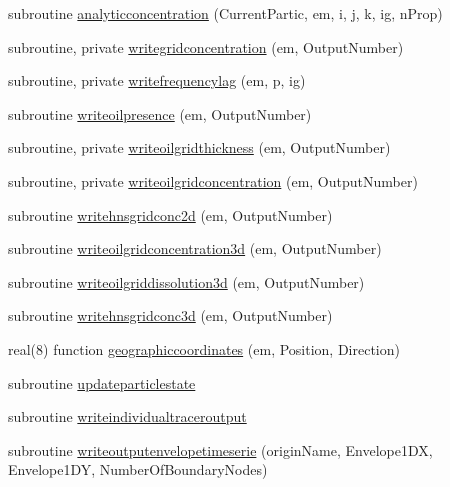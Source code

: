 \begin{DoxyCompactItemize}
\item 
subroutine \mbox{\hyperlink{namespacemodulelagrangianglobal_a8a4e3b4aa0ee023ec48a0d9e44b5df43}{analyticconcentration}} (Current\+Partic, em, i, j, k, ig, n\+Prop)
\item 
subroutine, private \mbox{\hyperlink{namespacemodulelagrangianglobal_a071a32ced5fdfb667319483a8fd208b7}{writegridconcentration}} (em, Output\+Number)
\item 
subroutine, private \mbox{\hyperlink{namespacemodulelagrangianglobal_a091fa515c0c76fbe52d2c31ad026151d}{writefrequencylag}} (em, p, ig)
\item 
subroutine \mbox{\hyperlink{namespacemodulelagrangianglobal_ab6a14231f1191c9852f886b90950db80}{writeoilpresence}} (em, Output\+Number)
\item 
subroutine, private \mbox{\hyperlink{namespacemodulelagrangianglobal_a388d34c449f0175617349ab4081a3dd4}{writeoilgridthickness}} (em, Output\+Number)
\item 
subroutine, private \mbox{\hyperlink{namespacemodulelagrangianglobal_a82208b2a591060e1fa3a3e0726bfe869}{writeoilgridconcentration}} (em, Output\+Number)
\item 
subroutine \mbox{\hyperlink{namespacemodulelagrangianglobal_abb393e682c261146ef53a65a75c60c4a}{writehnsgridconc2d}} (em, Output\+Number)
\item 
subroutine \mbox{\hyperlink{namespacemodulelagrangianglobal_ab2996daa63e4058df80e1dc7894c41af}{writeoilgridconcentration3d}} (em, Output\+Number)
\item 
subroutine \mbox{\hyperlink{namespacemodulelagrangianglobal_ac2eff795bcd9d725896afa0d50c89794}{writeoilgriddissolution3d}} (em, Output\+Number)
\item 
subroutine \mbox{\hyperlink{namespacemodulelagrangianglobal_a94325a61c883247ceef185733a82f5d2}{writehnsgridconc3d}} (em, Output\+Number)
\item 
real(8) function \mbox{\hyperlink{namespacemodulelagrangianglobal_ab37072f11c5d0760a6306426f0173b84}{geographiccoordinates}} (em, Position, Direction)
\item 
subroutine \mbox{\hyperlink{namespacemodulelagrangianglobal_ab509b6f03f7bc88920c0f876849e0b4e}{updateparticlestate}}
\item 
subroutine \mbox{\hyperlink{namespacemodulelagrangianglobal_adbd561b298718cf3849462a24cca974e}{writeindividualtraceroutput}}
\item 
subroutine \mbox{\hyperlink{namespacemodulelagrangianglobal_a730caaa1e8cb909c0d86b6d7c081175c}{writeoutputenvelopetimeserie}} (origin\+Name, Envelope1\+DX, Envelope1\+DY, Number\+Of\+Boundary\+Nodes)

\end{DoxyCompactItemize}
